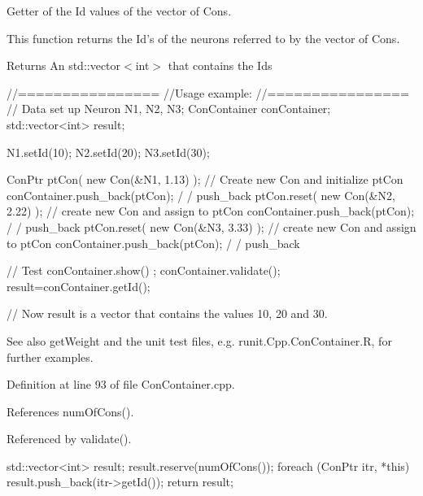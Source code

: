 Getter of the Id values of the vector of Cons. 

This function returns the Id's of the neurons referred to by the vector of Cons. \begin{DoxyReturn}{Returns}
An std::vector$<$int$>$ that contains the Ids
\end{DoxyReturn}

\begin{DoxyCode}
  //================
  //Usage example:
  //================
        // Data set up
                        Neuron N1, N2, N3;
                        ConContainer conContainer;
                        std::vector<int> result;

                        N1.setId(10);
                        N2.setId(20);
                        N3.setId(30);

                        ConPtr ptCon( new Con(&N1, 1.13) );     // Create new Con
       and initialize ptCon
                        conContainer.push_back(ptCon);                          /
      / push_back
                        ptCon.reset(  new Con(&N2, 2.22) );             // create
       new Con and assign to ptCon
                        conContainer.push_back(ptCon);                          /
      / push_back
                        ptCon.reset(  new Con(&N3, 3.33) );             // create
       new Con and assign to ptCon
                        conContainer.push_back(ptCon);                          /
      / push_back

        // Test
                        conContainer.show() ;
                        conContainer.validate();
                        result=conContainer.getId();

        // Now result is a vector that contains the values 10, 20 and 30.
\end{DoxyCode}


\begin{DoxySeeAlso}{See also}
getWeight and the unit test files, e.g. runit.Cpp.ConContainer.R, for further examples. 
\end{DoxySeeAlso}


Definition at line 93 of file ConContainer.cpp.



References numOfCons().



Referenced by validate().


\begin{DoxyCode}
{
  std::vector<int> result;
  result.reserve(numOfCons());
  foreach (ConPtr itr, *this)
    {
      result.push_back(itr->getId());
    }
  return result;
}
\end{DoxyCode}


